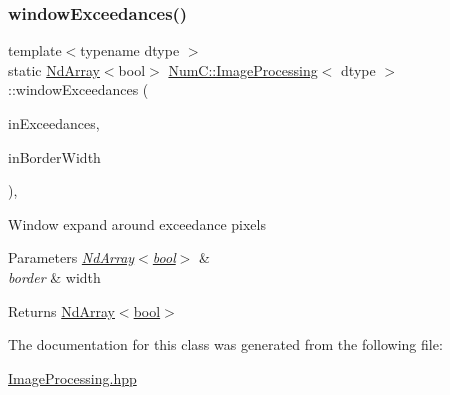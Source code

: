 \subsubsection{\texorpdfstring{window\+Exceedances()}{windowExceedances()}}
{\footnotesize\ttfamily template$<$typename dtype $>$ \\
static \mbox{\hyperlink{class_num_c_1_1_nd_array}{Nd\+Array}}$<$bool$>$ \mbox{\hyperlink{class_num_c_1_1_image_processing}{Num\+C\+::\+Image\+Processing}}$<$ dtype $>$\+::window\+Exceedances (\begin{DoxyParamCaption}\item[{const \mbox{\hyperlink{class_num_c_1_1_nd_array}{Nd\+Array}}$<$ bool $>$ \&}]{in\+Exceedances,  }\item[{\mbox{\hyperlink{namespace_num_c_a60b2e2f49e1ff61059731c154e560869}{uint8}}}]{in\+Border\+Width }\end{DoxyParamCaption})\hspace{0.3cm}{\ttfamily [inline]}, {\ttfamily [static]}}

Window expand around exceedance pixels


\begin{DoxyParams}{Parameters}
{\em \mbox{\hyperlink{class_num_c_1_1_nd_array}{Nd\+Array$<$bool$>$}}} & \\
\hline
{\em border} & width \\
\hline
\end{DoxyParams}
\begin{DoxyReturn}{Returns}
\mbox{\hyperlink{class_num_c_1_1_nd_array}{Nd\+Array$<$bool$>$}} 
\end{DoxyReturn}


The documentation for this class was generated from the following file\+:\begin{DoxyCompactItemize}
\item 
\mbox{\hyperlink{_image_processing_8hpp}{Image\+Processing.\+hpp}}\end{DoxyCompactItemize}
